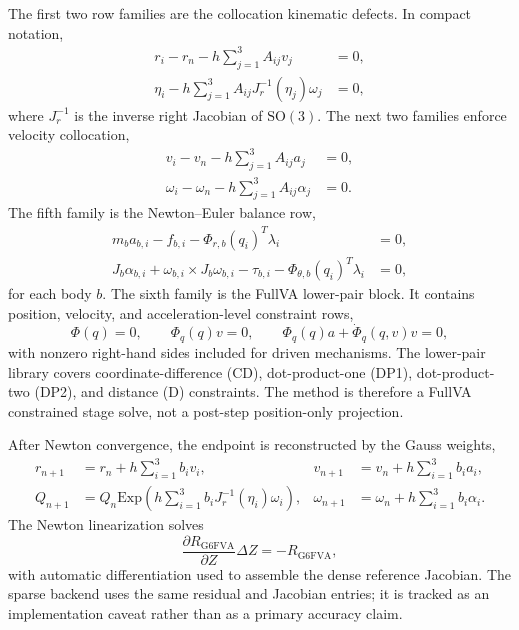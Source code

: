 \documentclass[preprint,12pt]{elsarticle}
\begin{document}
The first two row families are the collocation kinematic defects. In compact
notation,
\begin{align}
  r_i-r_n-h\sum_{j=1}^3 A_{ij}v_j &=0, \label{eq:trans-collocation}\\
  \eta_i-h\sum_{j=1}^3 A_{ij}J_r^{-1}(\eta_j)\omega_j &=0,
  \label{eq:rot-collocation}
\end{align}
where $J_r^{-1}$ is the inverse right Jacobian of $\mathrm{SO}(3)$. The next
two families enforce velocity collocation,
\begin{align}
  v_i-v_n-h\sum_{j=1}^3 A_{ij}a_j &=0, \label{eq:v-collocation}\\
  \omega_i-\omega_n-h\sum_{j=1}^3 A_{ij}\alpha_j &=0.
  \label{eq:w-collocation}
\end{align}
The fifth family is the Newton--Euler balance row,
\begin{align}
  m_b a_{b,i}-f_{b,i}-\Phi_{r,b}(q_i)^T\lambda_i &=0,
  \label{eq:trans-balance}\\
  J_b\alpha_{b,i}+\omega_{b,i}\times J_b\omega_{b,i}
  -\tau_{b,i}-\Phi_{\theta,b}(q_i)^T\lambda_i &=0,
  \label{eq:rot-balance}
\end{align}
for each body $b$. The sixth family is the FullVA lower-pair block. It
contains position, velocity, and acceleration-level constraint rows,
\begin{equation}
  \Phi(q)=0,\qquad
  \Phi_q(q)v=0,\qquad
  \Phi_q(q)a+\dot{\Phi}_q(q,v)v=0,
  \label{eq:fullva}
\end{equation}
with nonzero right-hand sides included for driven mechanisms. The lower-pair
library covers coordinate-difference (CD), dot-product-one (DP1),
dot-product-two (DP2), and distance (D) constraints. The method is therefore
a FullVA constrained stage solve, not a post-step position-only projection.

After Newton convergence, the endpoint is reconstructed by the Gauss weights,
\begin{align}
  r_{n+1} &= r_n+h\sum_{i=1}^3 b_i v_i, &
  v_{n+1} &= v_n+h\sum_{i=1}^3 b_i a_i, \label{eq:end-trans}\\
  Q_{n+1} &= Q_n\mathrm{Exp}\!\left(h\sum_{i=1}^3 b_i
      J_r^{-1}(\eta_i)\omega_i\right), &
  \omega_{n+1} &= \omega_n+h\sum_{i=1}^3 b_i \alpha_i .
  \label{eq:end-rot}
\end{align}
The Newton linearization solves
\begin{equation}
  \frac{\partial R_{\mathrm{G6FVA}}}{\partial Z}\Delta Z
  =-R_{\mathrm{G6FVA}},
  \label{eq:newton}
\end{equation}
with automatic differentiation used to assemble the dense reference Jacobian.
The sparse backend uses the same residual and Jacobian entries; it is tracked
as an implementation caveat rather than as a primary accuracy claim.
\end{document}
